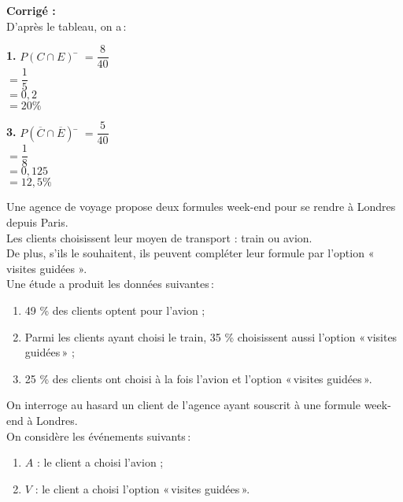 \documentclass[a4paper,11pt,exos]{nsi} %
\begin{document}
\textcolor{UGLiBlue}{\textbf{Corrigé :}\\
D'après le tableau, on a\,:
\begin{multicols}{2}
    \begin{tabbing}
        \textbf{1.} $P(C\cap E)$ \= $=\dfrac{8}{40}$\\[.5em]
        \> $=\dfrac{1}{5}$\\[.5em]
        \> $=0{,}2$\\[.5em]
        \> $=20\%$
    \end{tabbing}
    \begin{tabbing}
        \textbf{3.} $P(\overline{C}\cap \overline{E})$ \= $=\dfrac{5}{40}$\\[.5em]
        \> $=\dfrac{1}{8}$\\[.5em]
        \> $=0,125$\\[.5em]
        \> $=12,5\%$
    \end{tabbing}
\end{multicols}
}

\newpage

\exo{}
Une agence de voyage propose deux formules week-end pour se rendre à Londres depuis Paris.\\ Les clients choisissent leur moyen de transport : train ou avion.\\ De plus, s'ils le souhaitent, ils peuvent compléter leur formule par l'option  « visites guidées ».\\[.5em]
Une étude a produit les données suivantes\,:
\begin{enumerate}[label=\textbullet]
    \item 49 \% des clients optent pour l'avion ;
    \item Parmi les clients ayant choisi le train, 35 \% choisissent aussi l'option  «\,visites guidées\,» ;
    \item 25 \% des clients ont choisi à la fois l'avion et l'option  «\,visites guidées\,».
\end{enumerate}

 On interroge au hasard un client de l'agence ayant souscrit à une formule week-end à Londres.\\ On considère les événements suivants\,:
 \begin{enumerate}[label=\textbullet]
     \item $A$ :  le client a choisi l'avion ;
     \item $V$ : le client a choisi l'option  «\,visites guidées\,».
 \end{enumerate}
\end{document}
